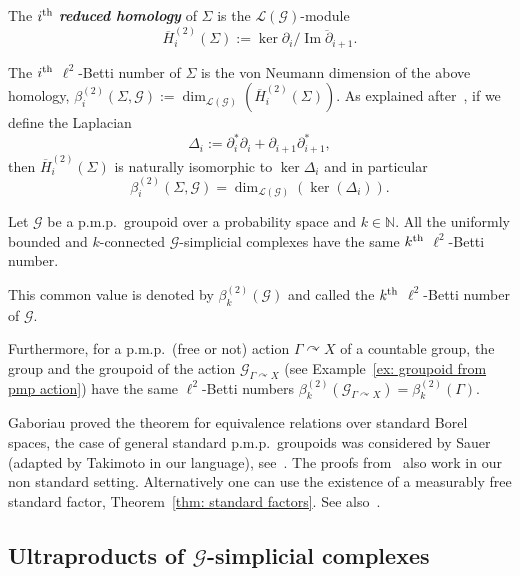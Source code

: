 \documentclass[AHL,Unicode,longabstracts,published]{cedram}
\newcommand{\defin}[1]{\textbf{\emph{#1}}}
\newcommand{\Nmath}{\mathbb{N}}
\newcommand{\acting}{\curvearrowright}
\newcommand{\LL}{\mathcal{L}}
\newcommand{\cg}{\mathcal{G}}
\DeclareMathOperator{\Ima}{Im}
\newcommand{\pmp}{p.m.p.\ }
\newcommand{\lvN}{\mathcal{L}(\cg)}
\begin{document}
The $i^{\rm th}$ \defin{reduced homology} of $\Sigma$ is the $\lvN$-module
\[
\overline H_i^{(2)}(\Sigma) := \ker \partial_i / \overline{\Ima \partial_{i+1}}.
\]

The $i^{\rm th}$ $\ell^2$-Betti number of $\Sigma$ is the von Neumann dimension of the above homology, $\beta^{(2)}_i(\Sigma,\cg):=\dim_{\LL(\cg)}(\overline H_i^{(2)}(\Sigma))$. As explained after~\cite[Definition~3.6]{gab_ihes}, if we define the Laplacian
\[
\Delta_i:=\partial_i^*\partial_i+\partial_{i+1}\partial_{i+1}^*,
\]
then $\overline H_i^{(2)}(\Sigma)$ is naturally isomorphic to $\ker\Delta_i$ and in particular
\[
\beta^{(2)}_i(\Sigma,\cg)=\dim_{\LL(\cg)}(\ker(\Delta_i)).
\]

\begin{theo}[Gaboriau]\label{thm:bettibound}
Let $\cg$ be a \pmp groupoid over a probability space and $k\in\Nmath$. All the uniformly bounded and $k$-connected $\cg$-simplicial complexes have the same $k^{\rm th}$ $\ell^2$-Betti number.


This common value is denoted by $\beta^{(2)}_k(\cg)$ and called the $k^{\rm th}$ $\ell^2$-Betti number of $\cg$.

Furthermore, for a \pmp (free or not) action $\Gamma\acting X$ of a countable group, the group and the groupoid of the action $\cg_{\Gamma\acting X}$ (see Example~\ref{ex: groupoid from pmp action}) have the same $\ell^2$-Betti numbers $\beta^{(2)}_k(\cg_{\Gamma\acting X})=\beta^{(2)}_k(\Gamma)$.
\end{theo}



\begin{rema}
Gaboriau proved the theorem for equivalence relations over standard Borel spaces, the case of general standard \pmp groupoids was considered by Sauer (adapted by Takimoto in our language), see~\cite{Sauer-Betti-groupoids-2005,Takimoto-cost-L2-2005}. The proofs from~\cite{gab_ihes, Takimoto-cost-L2-2005} also work in our non standard setting. Alternatively one can use the existence of a measurably free standard factor, Theorem~\ref{thm: standard factors}. See also~\cite{Aaserud-Popa}.
\end{rema}

\subsection{\texorpdfstring{Ultraproducts of $\cg$-simplicial complexes}{Ultraproducts of G-simplicial complexes}}\label{sect: ultraprod of cg-simplicial complexes}
\end{document}
